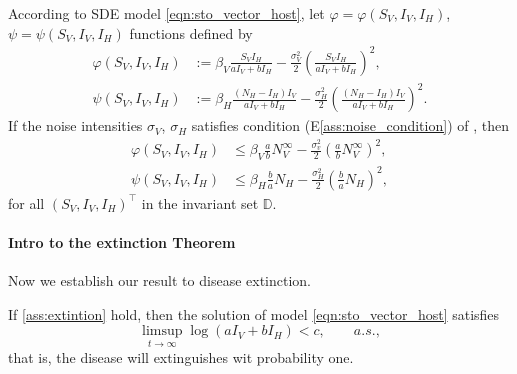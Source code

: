 \begin{proposition}
    According to SDE model \eqref{eqn:sto_vector_host},
    let $\varphi = \varphi (S_V, I_V, I_H)$, 
    $\psi = \psi (S_V, I_V, I_H)$ 
    functions defined by
    \begin{equation}
        \begin{aligned}
            \varphi (S_V, I_V, I_H) &:= 
                \beta_V \frac{S_V I_H}{a I_V + b I_H}
                - 
                \frac{\sigma_V ^ 2}{2} 
                \left(
                    \frac{S_V I_H}{a I_V + b I_H}
                \right) ^2,
            \\
            \psi (S_V, I_V, I_H) &:=
            \beta_H \frac{(N_H - I_H)  I_V}{a I_V + b I_H}
                - 
                \frac{\sigma_H ^ 2}{2} 
                \left(
                    \frac{(N_H - I_H)  I_V}{a I_V + b I_H}
                \right) ^2.
        \end{aligned}
    \end{equation}
    If the noise intensities $\sigma_V$, $\sigma_H$ satisfies condition 
    (E\textendash\ref{ass:noise_condition})
    of , then
    \begin{equation}
        \begin{aligned}
          \varphi (S_V, I_V, I_H) & \leq \beta_V \frac{a}{b} N_V ^ 
          {\infty}
         - \frac{\sigma_v ^ 2}{2}
          \left(
                  \frac{a}{b} N_V ^ {\infty}
              \right) ^ 2,
          \\
          \psi (S_V, I_V, I_H) & \leq
              \beta_H \frac{b}{a} N_H - \frac{\sigma_H ^ 2}{2}
              \left(
                  \frac{b}{a} N_H
              \right) ^ 2,
        \end{aligned}
    \end{equation}
for all $(S_V, I_V, I_H)^{\top}$ in the invariant set $\mathbb{D}$.
\end{proposition}
%
%
%
%
%
%
\paragraph{Intro to the extinction Theorem}
Now we establish our result to disease extinction.
\begin{theorem}
    If \cref{ass:extintion} hold, then the solution of model 
    \eqref{eqn:sto_vector_host} satisfies
    \begin{equation}
        \limsup_{t \to \infty}
            \log(aI_V + b I_H) < c , \qquad a.s.,
    \end{equation}
that is, the disease will extinguishes wit probability one.
\end{theorem}